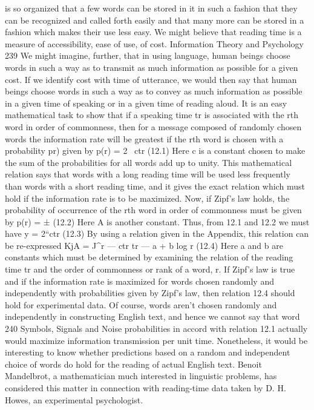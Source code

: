 {{{{{{{{{{{is so organized that a few words can be stored in it in such a
fashion that they can be recognized and called forth easily and that
many more can be stored in a fashion which makes their use less
easy. We might believe that reading time is a measure of accessibility,
ease of use, of cost.
Information Theory and Psychology
239
We might imagine, further, that in using language, human beings
choose words in such a way as to transmit as much information
as possible for a given cost. If we identify cost with time of utterance,
we would then say that human beings choose words in such
a way as to convey as much information as possible in a given
time of speaking or in a given time of reading aloud.
It is an easy mathematical task to show that if a speaking time
tr is associated with the rth word in order of commonness, then
for a message composed of randomly chosen words the information
rate will be greatest if the rth word is chosen with a probability
p{r) given by
p(r) = 2 ~ctr (12.1)
Here c is a constant chosen to make the sum of the probabilities
for all words add up to unity. This mathematical relation says that
words with a long reading time will be used less frequently than
words with a short reading time, and it gives the exact relation
which must hold if the information rate is to be maximized.
Now, if Zipf’s law holds, the probability of occurrence of the
rth word in order of commonness must be given by
p(r) = ± (12.2)
Here A is another constant. Thus, from 12.1 and 12.2 we must have
y = 2“ctr (12.3)
By using a relation given in the Appendix, this relation can be
re-expressed KjA = J^r — ctr
tr — a + b log r (12.4)
Here a and b are constants which must be determined by examining
the relation of the reading time tr and the order of commonness
or rank of a word, r. If Zipf’s law is true and if the information
rate is maximized for words chosen randomly and independently
with probabilities given by Zipf’s law, then relation 12.4 should
hold for experimental data.
Of course, words aren’t chosen randomly and independently in
constructing English text, and hence we cannot say that word
240
Symbols, Signals and Noise
probabilities in accord with relation 12.1 actually would maximize
information transmission per unit time. Nonetheless, it would be
interesting to know whether predictions based on a random and
independent choice of words do hold for the reading of actual
English text.
Benoit Mandelbrot, a mathematician much interested in linguistic
problems, has considered this matter in connection with
reading-time data taken by D. H. Howes, an experimental psychologist.
}}}}}}}}}}}}
